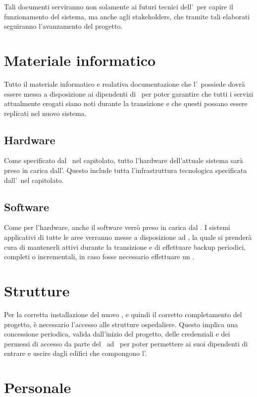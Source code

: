 	Tali documenti serviranno non solamente ai futuri tecnici dell'\istituto~per capire il funzionamento del sistema, ma anche agli stakeholders, che tramite tali elaborati seguiranno l'avanzamento del progetto.

\section{Materiale informatico}

	Tutto il materiale informatico e realativa documentazione che l'\istituto~possiede dovrà essere messa a disposizione ai dipendenti di \azienda~per poter garantire che tutti i servizi attualmente erogati siano noti durante la transizione e che questi possano essere replicati nel nuovo sistema.

	\subsection{Hardware}
		
		Come specificato dal \proponente~nel capitolato, tutto l'hardware dell'attuale sistema sarà preso in carica dall'\offerente.
		Questo include tutta l'infrastruttura tecnologica specificata dall'\istituto~nel capitolato.
		
	\subsection{Software}
	
		Come per l'hardware, anche il software verrò preso in carica dal \offerente.
		I sistemi applicativi di tutte le aree verranno messe a disposizione ad \azienda, la quale si prenderà cura di mantenerli attivi durante la transizione e di effettuare backup periodici, completi o incrementali, in caso fosse necessario effettuare un \rollback.
	
\section{Strutture}

	Per la corretta installazione del nuovo \helpdesk, e quindi il corretto completamento del progetto, è necessario l'accesso alle strutture ospedaliere.
	Questo implica una concessione periodica, valida dall'inizio del progetto, delle credenziali e dei permessi di accesso da parte del \proponente~ad \azienda~per poter permettere ai suoi dipendenti di entrare e uscire dagli edifici che compongono l'\istituto.

\section{Personale}

